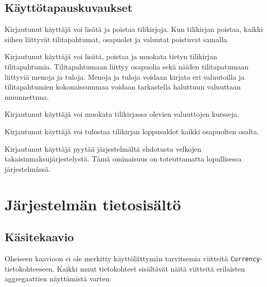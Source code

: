 \documentclass[a4paper,parskip=half]{scrartcl}
\begin{document}
\subsection{Käyttötapauskuvaukset}

\begin{description}[style=nextline]
  \item[tilikirjojen käsittely]{
      Kirjautunut käyttäjä voi lisätä ja poistaa tilikirjoja. Kun tilikirjan
      poistaa, kaikki siihen liittyvät tilitapahtumat, osapuolet ja valuutat
      poistuvat samalla.
    }
  \item[tilitapahtumien käsittely]{
      Kirjautunut käyttäjä voi lisätä, poistaa ja muokata tietyn tilikirjan
      tilitapahtumia. Tilitapahtumaan liittyy osapuolia sekä näiden
      tilitapatumaan liittyviä menoja ja tuloja. Menoja ja tuloja voidaan
      kirjata eri valuutoilla ja tilitapahtumien kokonaissummaa voidaan
      tarkastella haluttuun valuuttaan muunnettuna.
    }
  \item[valuuttakurssien muokkaus]{
      Kirjautunut käyttäjä voi muokata tilikirjassa olevien valuuttojen
      kursseja.
    }
  \item[loppusaldojen tulostus]{
      Kirjautunut käyttäjä voi tulostaa tilikirjan loppusaldot kaikki
      osapuolten osalta.
    }
  \item[maksusuunnitelman tulostus]{
      Kirjautunut käyttäjä pyytää järjestelmältä ehdotusta velkojen
      takaisinmaksujärjestelystä. Tämä ominaisuus on toteuttamatta lopullisessa
      järjestelmässä.
    }
\end{description}

\section{Järjestelmän tietosisältö}

\subsection{Käsitekaavio}

Oheiseen kaavioon ei ole merkitty käyttöliittymän tarvitsemia viitteitä
\texttt{Currency}-tietokohteeseen. Kaikki muut tietokohteet sisältävät
näitä viitteitä erilaisten aggregaattien näyttämistä varten.

\begin{center}
\end{center}
\end{document}
